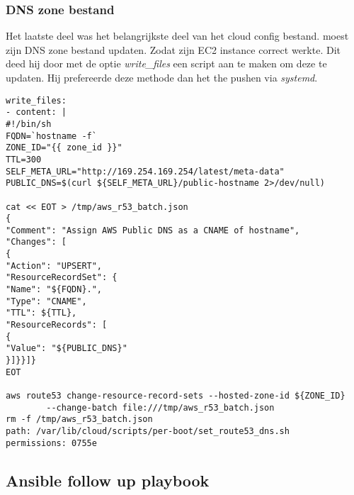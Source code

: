 \subsubsection{DNS zone bestand}
Het laatste deel was het belangrijkste deel van het cloud config bestand. \autocite{scottharney} moest zijn DNS zone bestand updaten. Zodat zijn EC2 instance correct werkte. Dit deed hij door met de optie \textit{write\_files} een script aan te maken om deze te updaten. Hij prefereerde deze methode dan het the pushen via \textit{systemd}.
\begin{lstlisting}
write_files:
- content: |
#!/bin/sh
FQDN=`hostname -f`
ZONE_ID="{{ zone_id }}"
TTL=300
SELF_META_URL="http://169.254.169.254/latest/meta-data"
PUBLIC_DNS=$(curl ${SELF_META_URL}/public-hostname 2>/dev/null)

cat << EOT > /tmp/aws_r53_batch.json
{
"Comment": "Assign AWS Public DNS as a CNAME of hostname",
"Changes": [
{
"Action": "UPSERT",
"ResourceRecordSet": {
"Name": "${FQDN}.",
"Type": "CNAME",
"TTL": ${TTL},
"ResourceRecords": [
{
"Value": "${PUBLIC_DNS}"
}]}}]}
EOT

aws route53 change-resource-record-sets --hosted-zone-id ${ZONE_ID} 
		--change-batch file:///tmp/aws_r53_batch.json
rm -f /tmp/aws_r53_batch.json
path: /var/lib/cloud/scripts/per-boot/set_route53_dns.sh
permissions: 0755e
\end{lstlisting}
\subsection{Ansible follow up playbook}
